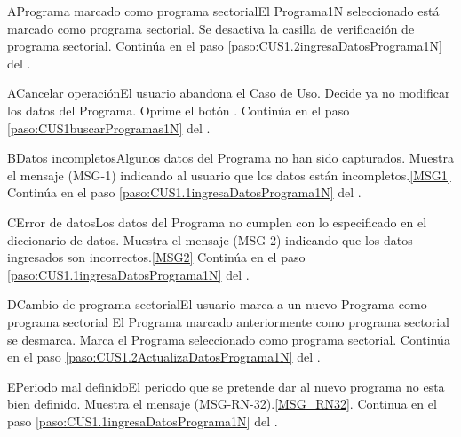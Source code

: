 	\begin{UCtrayectoriaA}{A}{Programa marcado como programa sectorial}{El Programa1N seleccionado est\'a marcado como programa sectorial.}
		\UCpaso Se desactiva la casilla de verificaci\'on de programa sectorial.
		\UCpaso Contin\'ua en el paso \ref{paso:CUS1.2ingresaDatosPrograma1N} del .
	\end{UCtrayectoriaA}

	\begin{UCtrayectoriaA}{A}{Cancelar operaci\'on}{El usuario abandona el Caso de Uso.}
			\UCpaso[\UCactor] Decide ya no modificar los datos del Programa.
			\UCpaso[\UCactor] Oprime el bot\'on .
			\UCpaso Contin\'ua en el paso \ref{paso:CUS1buscarProgramas1N} del .
	\end{UCtrayectoriaA}
		
	\begin{UCtrayectoriaA}{B}{Datos incompletos}{Algunos datos del Programa no han sido capturados.}
			\UCpaso Muestra el mensaje (MSG-1) indicando al usuario que los datos est\'an incompletos.\ref{MSG1}
			\UCpaso Contin\'ua en el paso \ref{paso:CUS1.1ingresaDatosPrograma1N} del .
	\end{UCtrayectoriaA}
		
	\begin{UCtrayectoriaA}{C}{Error de datos}{Los datos del Programa no cumplen con lo especificado en el diccionario de datos.}
			\UCpaso Muestra el mensaje (MSG-2) indicando que los datos ingresados son incorrectos.\ref{MSG2}
			\UCpaso Contin\'ua en el paso \ref{paso:CUS1.1ingresaDatosPrograma1N} del .
	\end{UCtrayectoriaA}

	\begin{UCtrayectoriaA}{D}{Cambio de programa sectorial}{El usuario marca a un nuevo Programa como programa sectorial}
                        \UCpaso El Programa marcado anteriormente como programa sectorial se desmarca.
			\UCpaso Marca el Programa seleccionado como programa sectorial.
			\UCpaso Contin\'ua en el paso \ref{paso:CUS1.2ActualizaDatosPrograma1N} del .
	\end{UCtrayectoriaA}

	\begin{UCtrayectoriaA}{E}{Periodo mal definido}{El periodo que se pretende dar al nuevo programa no esta bien definido.}
		\UCpaso Muestra el mensaje (MSG-RN-32).\ref{MSG_RN32}.
		\UCpaso Continua en el paso \ref{paso:CUS1.1ingresaDatosPrograma1N} del .
	\end{UCtrayectoriaA}

